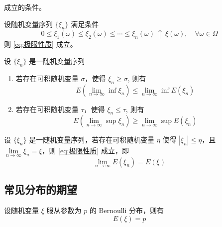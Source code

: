 \documentclass[12pt,a4paper]{amsart}
\begin{document}
成立的条件。

\begin{proposition}[单调收敛定理]
    设随机变量序列 $\{\xi_n\}$ 满足条件
    \begin{equation}
        0 \leq \xi_1(\omega) \leq \xi_2(\omega) \leq \cdots \leq \xi_n(\omega) ~ \uparrow ~ \xi(\omega), \quad \forall \omega \in \Omega
    \end{equation}
    则 \ref{eq:极限性质} 成立。
\end{proposition}

\begin{proposition}[Fatou 引理]
    设 $\{\xi_n\}$ 是一随机变量序列
    \begin{enumerate}
        \item 若存在可积随机变量 $\sigma$，使得 $\xi_n \geq \sigma$, 则有
        \begin{equation}
            E(\lim\limits_{n\to\infty} \inf \xi_n) \leq \lim\limits_{n\to\infty} \inf E(\xi_n)
        \end{equation}
        \item 若存在可积随机变量 $\tau$，使得 $\xi_n \leq \tau$, 则有
        \begin{equation}
            E(\lim\limits_{n\to\infty} \sup \xi_n) \geq \lim\limits_{n\to\infty} \sup E(\xi_n)
        \end{equation}
    \end{enumerate}
\end{proposition}

\begin{proposition}
    设 $\{\xi_n\}$ 是一随机变量序列，若存在可积随机变量 $\eta$ 使得 $|\xi_n| \leq \eta$，且 $\lim\limits_{n\to\infty} \xi_n = \xi$，则 \ref{eq:极限性质} 成立，即
    \begin{equation}
        \lim\limits_{n\to\infty} E(\xi_n) = E(\xi)
    \end{equation}
\end{proposition}

\subsection{常见分布的期望}

\begin{proposition}
    设随机变量 $\xi$ 服从参数为 $p$ 的 Bernoulli 分布，则有
    \begin{equation}
        E(\xi) = p
    \end{equation}
\end{proposition}
\end{document}
